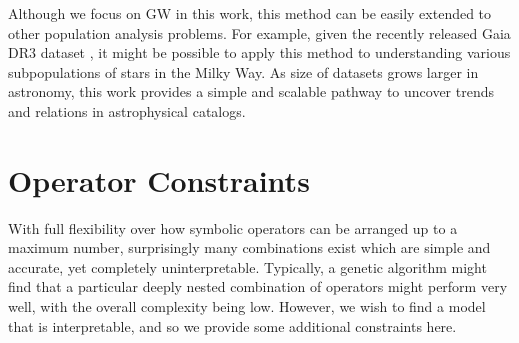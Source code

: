 \documentclass[nohyperref]{article}
\theoremstyle{plain}
\theoremstyle{definition}
\theoremstyle{remark}
\begin{document}
Although we focus on GW in this work, this method can be easily extended to other population analysis problems.
For example, given the recently released Gaia DR3 dataset \cite{Collaboration2016TheGM}, it might be possible to apply this method to understanding various subpopulations of  stars in the Milky Way.
As size of datasets grows larger in astronomy, this work provides a simple and scalable pathway to uncover trends and relations in astrophysical catalogs.





\clearpage
\appendix
\section{Operator Constraints}
\label{sec:constraints}

With full flexibility over how symbolic operators can be arranged up to a maximum number, surprisingly many combinations exist which are simple and accurate, yet completely uninterpretable.
Typically, a genetic algorithm might find that a particular deeply nested combination of operators might perform very well, with the overall complexity being low.
However, we wish to find a model that is interpretable, and so we provide some additional constraints here.
\end{document}
